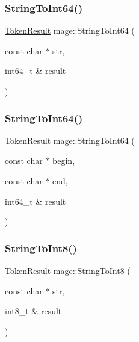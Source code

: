 \hypertarget{namespacemage_a9134bbf3717893628e324fcf83e203a0}{}\label{namespacemage_a9134bbf3717893628e324fcf83e203a0} 
\subsubsection{\texorpdfstring{String\+To\+Int64()}{StringToInt64()}\hspace{0.1cm}{\footnotesize\ttfamily [1/2]}}
{\footnotesize\ttfamily \hyperlink{namespacemage_a2178ba2411db5912f41b2e7698c2037d}{Token\+Result} mage\+::\+String\+To\+Int64 (\begin{DoxyParamCaption}\item[{const char $\ast$}]{str,  }\item[{int64\+\_\+t \&}]{result }\end{DoxyParamCaption})}

\hypertarget{namespacemage_a1e044f5c734c6597945b775100c45086}{}\label{namespacemage_a1e044f5c734c6597945b775100c45086} 
\subsubsection{\texorpdfstring{String\+To\+Int64()}{StringToInt64()}\hspace{0.1cm}{\footnotesize\ttfamily [2/2]}}
{\footnotesize\ttfamily \hyperlink{namespacemage_a2178ba2411db5912f41b2e7698c2037d}{Token\+Result} mage\+::\+String\+To\+Int64 (\begin{DoxyParamCaption}\item[{const char $\ast$}]{begin,  }\item[{const char $\ast$}]{end,  }\item[{int64\+\_\+t \&}]{result }\end{DoxyParamCaption})}

\hypertarget{namespacemage_ab7990acb6c8fb8e5eb578ef173e601f9}{}\label{namespacemage_ab7990acb6c8fb8e5eb578ef173e601f9} 
\subsubsection{\texorpdfstring{String\+To\+Int8()}{StringToInt8()}\hspace{0.1cm}{\footnotesize\ttfamily [1/2]}}
{\footnotesize\ttfamily \hyperlink{namespacemage_a2178ba2411db5912f41b2e7698c2037d}{Token\+Result} mage\+::\+String\+To\+Int8 (\begin{DoxyParamCaption}\item[{const char $\ast$}]{str,  }\item[{int8\+\_\+t \&}]{result }\end{DoxyParamCaption})}

